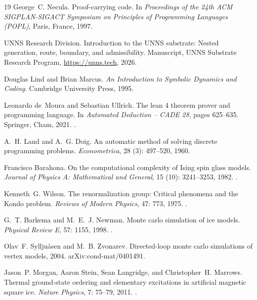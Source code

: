 \documentclass[11pt,a4paper]{article}
\theoremstyle{plain}
\theoremstyle{definition}
\theoremstyle{remark}
\begin{document}
\begin{thebibliography}{19}
George~C. Necula.
\newblock Proof-carrying code.
\newblock In \emph{Proceedings of the 24th ACM SIGPLAN-SIGACT Symposium on
  Principles of Programming Languages (POPL)}, Paris, France, 1997.

{UNNS Research Division}.
\newblock Introduction to the {UNNS} substrate: Nested generation, route,
  boundary, and admissibility.
\newblock Manuscript, UNNS Substrate Research Program, \url{https://unns.tech},
  2026.

Douglas Lind and Brian Marcus.
\newblock \emph{An Introduction to Symbolic Dynamics and Coding}.
\newblock Cambridge University Press, 1995.

Leonardo de~Moura and Sebastian Ullrich.
\newblock The lean 4 theorem prover and programming language.
\newblock In \emph{Automated Deduction -- CADE 28}, pages 625--635. Springer,
  Cham, 2021.
\newblock {}.

A.~H. Land and A.~G. Doig.
\newblock An automatic method of solving discrete programming problems.
\newblock \emph{Econometrica}, 28 (3): 497--520, 1960.

Francisco Barahona.
\newblock On the computational complexity of {I}sing spin glass models.
\newblock \emph{Journal of Physics A: Mathematical and General}, 15
  (10): 3241--3253, 1982.
\newblock {}.

Kenneth~G. Wilson.
\newblock The renormalization group: Critical phenomena and the {K}ondo
  problem.
\newblock \emph{Reviews of Modern Physics}, 47: 773, 1975.
\newblock {}.

G.~T. Barkema and M.~E.~J. Newman.
\newblock Monte carlo simulation of ice models.
\newblock \emph{Physical Review E}, 57: 1155, 1998.
\newblock {}.

Olav~F. Syllju{\aa}sen and M.~B. Zvonarev.
\newblock Directed-loop monte carlo simulations of vertex models, 2004.
\newblock arXiv:cond-mat/0401491.

Jason~P. Morgan, Aaron Stein, Sean Langridge, and Christopher~H. Marrows.
\newblock Thermal ground-state ordering and elementary excitations in
  artificial magnetic square ice.
\newblock \emph{Nature Physics}, 7: 75--79, 2011.
\newblock {}.


\end{thebibliography}
\end{document}
